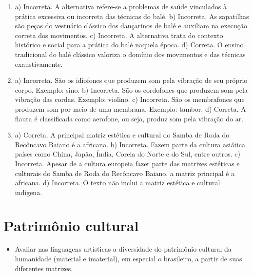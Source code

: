\begin{enumerate}
\item
a) Incorreta. A alternativa refere-se a problemas de saúde vinculados
à prática excessiva ou incorreta das técnicas do balé.
b) Incorreta. As sapatilhas são peças do vestuário clássico dos
dançarinos de balé e auxiliam na execução correta dos movimentos.
c) Incorreta. A alternativa trata do contexto histórico e social para a prática do
balé naquela época.
d) Correta. O ensino tradicional do balé clássico valoriza o domínio dos
movimentos e das técnicas exaustivamente.

\item
a) Incorreta. São os idiofones que produzem som pela vibração de
seu próprio corpo. Exemplo: sino.
b) Incorreta. São os cordofones que produzem som pela vibração das
cordas. Exemplo: violino.
c) Incorreta. São os membrafones que produzem som por meio de uma
membrana. Exemplo: tambor.
d) Correta. A flauta é classificada como aerofone, ou seja, produz som
pela vibração do ar.

\item
a) Correta. A principal matriz estética e cultural do Samba de Roda do
Recôncavo Baiano é a africana.
b) Incorreta. Fazem parte da cultura asiática países como China,
Japão, Índia, Coreia do Norte e do Sul, entre outros.
c) Incorreta. Apesar de a cultura europeia fazer parte das matrizes
estéticas e culturais do Samba de Roda do Recôncavo Baiano, a matriz
principal é a africana.
d) Incorreta. O texto não inclui a matriz estética e cultural indígena.
\end{enumerate}

\chapter{Patrimônio cultural}



\begin{itemize}
\item Avaliar nas linguagens artísticas a diversidade do patrimônio cultural
da humanidade (material e imaterial), em especial o brasileiro, a partir
de suas diferentes matrizes.
\end{itemize}

